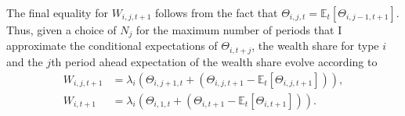 \documentclass[12 pt, oneside]{article}
\theoremstyle{definition}
\theoremstyle{definition}
\theoremstyle{definition}
\newcommand{\E}{\mathbb{E}}
\begin{document}
The final equality for $W_{i, j, t + 1}$ follows from the fact that $\Theta_{i, j, t} = \E_t[\Theta_{i, j - 1, t + 1}]$.
Thus, given a choice of $N_j$ for the maximum number of periods that I approximate the conditional expectations of $\Theta_{i, t + j}$, the wealth share for type $i$ and the $j$th period ahead expectation of the wealth share evolve according to
\begin{align}
  \label{eq:wealth share cond expectation j period defn}
  W_{i, j, t + 1} & = \lambda_i(\Theta_{i, j + 1, t} + (\Theta_{i, j, t + 1} - \E_t[\Theta_{i, j, t + 1}])),\\
  \label{eq:wealth share evolution}
  W_{i, t + 1} & = \lambda_i(\Theta_{i, 1, t} + (\Theta_{i, t + 1} - \E_t[\Theta_{i, t + 1}])).
\end{align}

\end{document}
